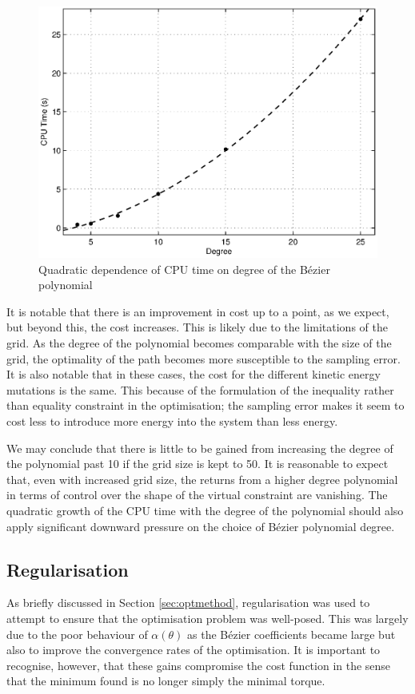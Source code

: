 \begin{figure}
\centering
\includegraphics[width=0.8\linewidth]{7Results/timevsdeg}
\caption{Quadratic dependence of CPU time on degree of the Bézier polynomial}
\label{fig:timevsdeg}
\end{figure}


It is notable that there is an improvement in cost up to a point, as we expect, but beyond this, the cost increases. This is likely due to the limitations of the grid. As the degree of the polynomial becomes comparable with the size of the grid, the optimality of the path becomes more susceptible to the sampling error. It is also notable that in these cases, the cost for the different kinetic energy mutations is the same. This because of the formulation of the inequality rather than equality constraint in the optimisation; the sampling error makes it seem to cost less to introduce more energy into the system than less energy.

We may conclude that there is little to be gained from increasing the degree of the polynomial past 10 if the grid size is kept to 50. It is reasonable to expect that, even with increased grid size, the returns from a higher degree polynomial in terms of control over the shape of the virtual constraint are vanishing. The quadratic growth of the CPU time with the degree of the polynomial should also apply significant downward pressure on the choice of Bézier polynomial degree.

\subsection{Regularisation}
As briefly discussed in Section \ref{sec:optmethod}, regularisation was used to attempt to ensure that the optimisation problem was well-posed. This was largely due to the poor behaviour of $\alpha(\theta)$ as the Bézier coefficients became large but also to improve the convergence rates of the optimisation. It is important to recognise, however, that these gains compromise the cost function in the sense that the minimum found is no longer simply the minimal torque.

